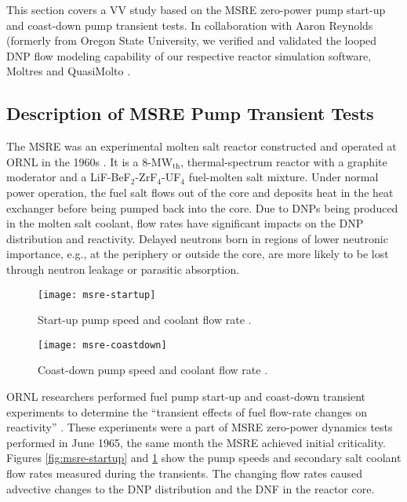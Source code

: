 This section covers a \gls{VV} study based on the \gls{MSRE} zero-power pump
start-up and coast-down pump transient tests. In collaboration with Aaron Reynolds (formerly from
Oregon State University, we verified and validated the looped \gls{DNP} flow modeling capability of
our respective reactor simulation software, Moltres and QuasiMolto \cite{reynolds_analysis_2023}.

\subsection{Description of MSRE Pump Transient Tests}

The \gls{MSRE} was an experimental molten salt reactor constructed and operated at \gls{ORNL} in
the 1960s \cite{haubenreich_experience_1970}. It is a 8-MW$_{\text{th}}$, thermal-spectrum reactor
with a graphite moderator and a LiF-BeF$_2$-ZrF$_4$-UF$_4$ fuel-molten salt mixture. Under normal
power operation, the fuel salt flows out of the core and deposits heat in the heat exchanger before
being pumped back into the core. Due to
\glspl{DNP} being produced in the molten salt coolant, flow rates have significant impacts on the
\gls{DNP} distribution and reactivity. Delayed neutrons born in regions of lower neutronic
importance, e.g., at the periphery or outside the core, are more likely to be lost through neutron
leakage or parasitic absorption.

\begin{figure}[htb]
  \centering
  \begin{minipage}[t]{0.49\textwidth}
    \centering
    \texttt{[image: msre-startup]}
    \caption{Start-up pump speed and coolant flow rate \cite{prince_zero-power_1968}.}
    \label{fig:msre-startup}
  \end{minipage}
  \hfill
  \begin{minipage}[t]{0.49\textwidth}
    \centering
    \texttt{[image: msre-coastdown]}
    \caption{Coast-down pump speed and coolant flow rate \cite{prince_zero-power_1968}.}
    \label{fig:msre-coastdown}
  \end{minipage}
\end{figure}

\gls{ORNL} researchers performed fuel pump start-up and coast-down transient experiments to
determine the ``transient effects of fuel flow-rate changes on reactivity''
\cite{prince_zero-power_1968}. These experiments were a part of \gls{MSRE} zero-power dynamics
tests performed in June 1965, the same month the \gls{MSRE} achieved initial criticality. Figures
\ref{fig:msre-startup} and \ref{fig:msre-coastdown} show the pump speeds and secondary salt coolant
flow rates measured during the transients. The changing flow rates caused advective changes to the
\gls{DNP} distribution and the \gls{DNF} in the reactor core.


